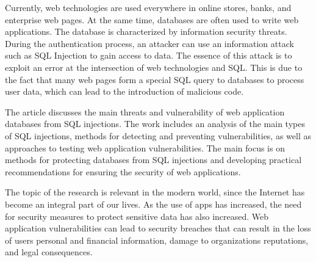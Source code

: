 Currently, web technologies are used everywhere in online stores, banks,
and enterprise web pages. At the same time, databases are often used to
write web applications. The database is characterized by information
security threats. During the authentication process, an attacker can use
an information attack such as SQL Injection to gain access to data. The
essence of this attack is to exploit an error at the intersection of web
technologies and SQL. This is due to the fact that many web pages form a
special SQL query to databases to process user data, which can lead to
the introduction of malicious code.

The article discusses the main threats and vulnerability of web
application databases from SQL injections. The work includes an analysis
of the main types of SQL injections, methods for detecting and
preventing vulnerabilities, as well as approaches to testing web
application vulnerabilities. The main focus is on methods for protecting
databases from SQL injections and developing practical recommendations
for ensuring the security of web applications.

The topic of the research is relevant in the modern world, since the
Internet has become an integral part of our lives. As the use of apps
has increased, the need for security measures to protect sensitive data
has also increased. Web application vulnerabilities can lead to security
breaches that can result in the loss of users\textquotesingle{} personal
and financial information, damage to organizations\textquotesingle{}
reputations, and legal consequences.

